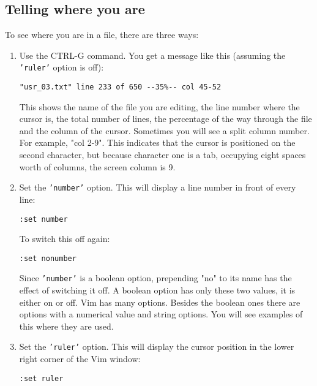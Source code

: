 \subsection{Telling where you are}
To see where you are in a file, there are three ways:
\begin{enumerate}
				\item  Use the CTRL-G command.
								You get a message like this (assuming the \texttt{'ruler'} option is off):
								\begin{Verbatim}[samepage=true]
	"usr_03.txt" line 233 of 650 --35%-- col 45-52 
								\end{Verbatim}

								This shows the name of the file you are editing, the line number where the cursor is, the total number of lines, the percentage of the way through the file and the column of the cursor.
								Sometimes you will see a split column number.
								For example, "col 2-9".
								This indicates that the cursor is positioned on the second character, but because character one is a tab, occupying eight spaces worth of columns, the screen column is 9.

				\item  Set the \texttt{'number'} option.  This will display a line number in front of
								every line:

								\begin{Verbatim}[samepage=true]
	:set number
								\end{Verbatim}

								To switch this off again:

								\begin{Verbatim}[samepage=true]
	:set nonumber
								\end{Verbatim}

								Since \texttt{'number'} is a boolean option, prepending "no" to its name has the effect of switching it off.
								A boolean option has only these two values, it is either on or off.
								Vim has many options.
								Besides the boolean ones there are options with a numerical value and string options.
								You will see examples of this where they are used.

				\item  Set the \texttt{'ruler'} option.
								This will display the cursor position in the lower right corner of the Vim window:

								\begin{Verbatim}[samepage=true]
	:set ruler
								\end{Verbatim}

\end{enumerate}

